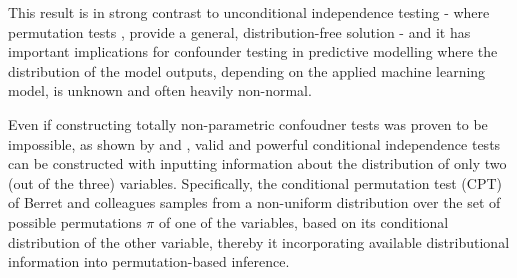 \documentclass{article}
\begin{document}
This result is in strong contrast to unconditional independence testing - where permutation tests  \citep{pitman1937significance, fisher1942189}, provide a general, distribution-free solution - and it has important implications for confounder testing in predictive modelling where the distribution of the model outputs, depending on the applied machine learning model, is unknown and often heavily non-normal.

Even if constructing totally non-parametric confoudner tests was proven to be impossible, as shown by \cite{berrett2020conditional} and \citep{candes2016panning}, valid and powerful conditional independence tests can be constructed with inputting information about the distribution of only two (out of the three) variables.
Specifically, the conditional permutation test (CPT) of Berret and colleagues samples from a non-uniform distribution over the set of possible permutations $\pi$ of one of the variables, based on its conditional distribution of the other variable, thereby it incorporating available distributional information into permutation-based inference.
\end{document}
